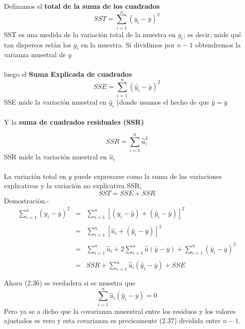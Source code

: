 Definamos el \textbf{total de la suma de los cuadrados}\\

\begin{equation}
    SST = \sum\limits_{i=1}^n (y_i - \overline{y})^2
\end{equation}
SST es una medida de la variación total de la muestra en $y_i$; es decir, mide qué tan dispersos están los $y_i$ en la muestra. Si dividimos por $n-1$ obtendremos la varianza muestral de $y$\\\\

luego el \textbf{Suma Explicada de cuadrados}\\

\begin{equation}
    SSE = \sum\limits_{i=1}^n (\hat{y}_i - \overline{y})^2
\end{equation}
SSE mide la variación muestral en $\hat{y}_i$ (donde usamos el hecho de que $\overline{\hat{y}} = \overline{y}$\\\\ 
Y la \textbf{suma de cuadrados residuales (SSR)}

\begin{equation}
    SSR = \sum\limits_{i=1}^n \hat{u}_i^2 
\end{equation}
SSR mide la variación muestral en $\hat{u}_i$\\\\

La variación total en $y$ puede expresarse como la suma de las variaciones explicativas y la variación no explicativa SSR, 
\begin{equation}
	SST = SSE + SSR
\end{equation}
Demostración.-\; 
$$\begin{array}{rcl}
    \sum\limits_{i=1}^n (y_i - \overline{y})^2&=&\sum\limits_{i=1}^n\left[(y_i - \hat{y})+(\hat{y}_i - \overline{y})\right]^2\\\\
					      &=&\sum\limits_{i=1}^n \left[\hat{u}_i + (\hat{y}_i - \overline{y})\right]^2 \\\\
					      &=&\sum\limits_{i=1}^n \hat{u}_i + 2\sum\limits_{i=1}^n\hat{u}(\hat{y}-\overline{y}) + \sum\limits_{i=1}^n (\hat{y}_i - \overline{y})^2\\\\
					      &=&SSR + \sum\limits_{i=1}^n \hat{u}_i (\hat{y}_i - \overline{y}) + SSE\\\\
\end{array}$$
Ahora (2.36) es verdadera si se muestra que 
$$\sum_{i=1}^n \hat{u}_i (\hat{y}_i - \overline{y}) = 0$$
Pero ya se a dicho que la covarianza mueestral entre los residuos y los valores ajustados es vero y esta covarianza es precisamente (2.37) dividida entre $n-1$.\\\\

